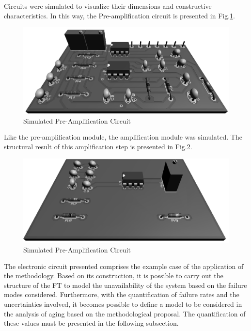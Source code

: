\documentclass{ws-m3as}
\begin{document}
Circuits were simulated to visualize their dimensions and constructive characteristics. In this way, the Pre-amplification circuit is presented in Fig.\ref{fig:18}.

\begin{figure}[H]
	\centering  
	\includegraphics[width=1\linewidth]{Figures/Preamp3D2}
	\caption{Simulated Pre-Amplification Circuit }
	\label{fig:18}
\end{figure}

Like the pre-amplification module, the amplification module was simulated. The structural result of this amplification step is presented in Fig.\ref{fig:19}.

\begin{figure}[H]
	\centering  
	\includegraphics[width=1\linewidth]{Figures/Amp3D2}
	\caption{Simulated Pre-Amplification Circuit}
	\label{fig:19}
\end{figure}

The electronic circuit presented comprises the example case of the application of the methodology. Based on its construction, it is possible to carry out the structure of the FT to model the unavailability of the system based on the failure modes considered. Furthermore, with the quantification of failure rates and the uncertainties involved, it becomes possible to define a model to be considered in the analysis of aging based on the methodological proposal. The quantification of these values must be presented in the following subsection.
\end{document}
